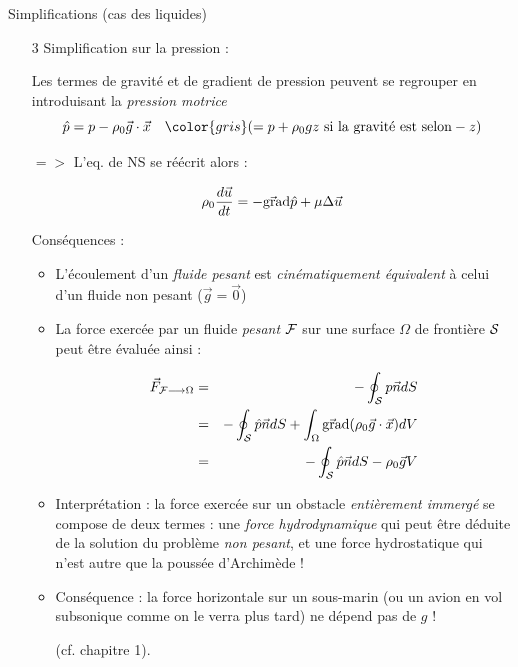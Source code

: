 \begin{frame}{Simplifications (cas des liquides)}
\small

\begin{enumerate}

\item[3] Simplification sur la pression :

Les termes de gravité et de gradient de pression peuvent se regrouper en introduisant la {\em pression motrice} 
$$
\hat{p} = p - \rho_0 \vec{g} \cdot \vec{x} \quad { \color{gris} ( = p + \rho_0 g z  \mbox{ si la gravité est selon} -z) }
$$

$=>$ L'eq. de NS se réécrit alors :

$$
\rho_0 \displaystyle \frac{d \vec{u}}{dt} 
= 
 - \vec{\mbox{\rm gra}}\mbox{\rm d} \hat{p} + \mu  \Delta \vec{u} 
$$

Conséquences :
\begin{itemize}

\item L'écoulement d'un {\em fluide pesant} est {\em cinématiquement équivalent} à celui d'un fluide non pesant ($\vec{g}=\vec{0}$)

\item La force exercée par un fluide {\em pesant} ${\cal F}$ sur une surface $\Omega$ de frontière $\cal S$ peut être évaluée ainsi :

\begin{eqnarray*} 
\vec{F}_{{\cal F} \longrightarrow \Omega} &=& - \oint_{\cal S} p \vec{n} dS 
\\
&=& - \oint_{\cal S} \hat{p} \vec{n} dS + \int_{\Omega}  \vec{\mbox{\rm gra}}\mbox{\rm d}( \rho_0 \vec{g} \cdot \vec{x}  ) dV 
\\
&=&  - \oint_{\cal S} \hat{p} \vec{n} dS - \rho_0 \vec{g} V
\end{eqnarray*}

\item Interprétation : la force exercée sur un obstacle {\em entièrement immergé} se compose de deux termes : une {\em force hydrodynamique}
qui peut être déduite de la solution du problème {\em non pesant}, et une force hydrostatique qui n'est autre que la poussée d'Archimède !

\item Conséquence : la force horizontale sur un sous-marin {\color{gris} (ou un avion en vol subsonique comme on le verra plus tard)} ne dépend pas de $g$ ! 

(cf. chapitre 1).

 \end{itemize}
 \end{enumerate}
 
 \end{frame}


